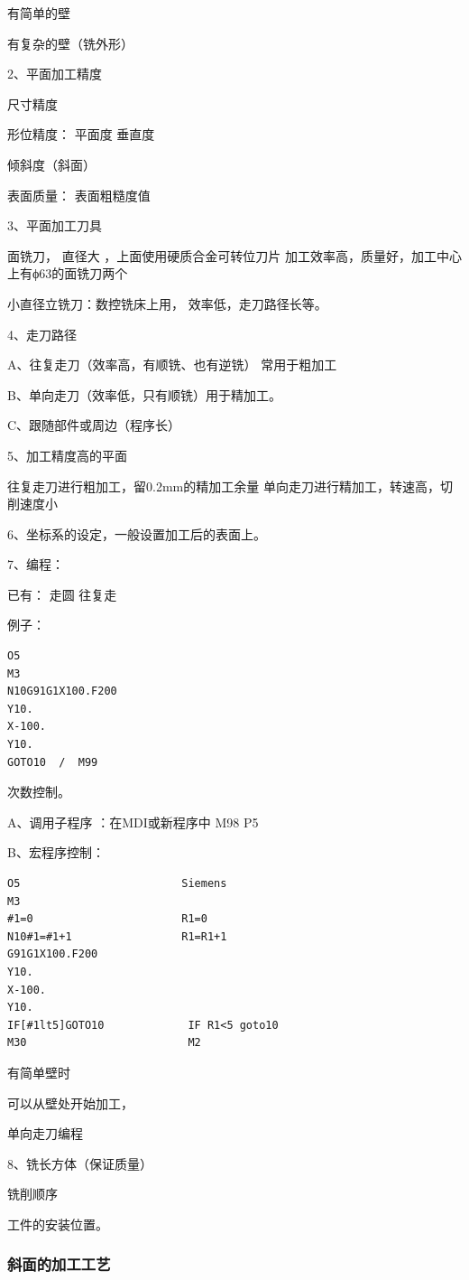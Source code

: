 有简单的壁

有复杂的壁（铣外形）

2、平面加工精度

尺寸精度 

形位精度：  平面度   垂直度

倾斜度（斜面）

表面质量：  表面粗糙度值

3、平面加工刀具

面铣刀， 直径大 ，上面使用硬质合金可转位刀片
加工效率高，质量好，加工中心上有ϕ63的面铣刀两个

小直径立铣刀：数控铣床上用，
效率低，走刀路径长等。

4、走刀路径

A、往复走刀（效率高，有顺铣、也有逆铣）
常用于粗加工

B、单向走刀（效率低，只有顺铣）用于精加工。

C、跟随部件或周边（程序长）

5、加工精度高的平面

往复走刀进行粗加工，留0.2mm的精加工余量
单向走刀进行精加工，转速高，切削速度小

6、坐标系的设定，一般设置加工后的表面上。

7、编程：

已有：  走圆  往复走

例子：
\begin{lstlisting}
O5
M3
N10G91G1X100.F200
Y10.
X-100.
Y10.
GOTO10  /  M99
\end{lstlisting}
次数控制。

A、调用子程序 ：在MDI或新程序中   M98 P5

B、宏程序控制：

\begin{lstlisting}
O5                         Siemens
M3
#1=0                       R1=0
N10#1=#1+1                 R1=R1+1
G91G1X100.F200              
Y10.
X-100.
Y10.
IF[#1lt5]GOTO10             IF R1<5 goto10
M30                         M2
\end{lstlisting}

有简单壁时

可以从壁处开始加工，

单向走刀编程

8、铣长方体（保证质量）

铣削顺序

工件的安装位置。

\subsubsection{斜面的加工工艺}

